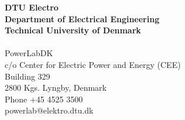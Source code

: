 \thispagestyle{empty} %
\frieze
\vspace*{\fill}
\noindent
\sffamily
\small
\textbf{DTU Electro}\\
\textbf{Department of Electrical Engineering}\\
\textbf{Technical University of Denmark}\\
\\
PowerLabDK\\
c/o Center for Electric Power and Energy (CEE)\\
Building 329\\
2800 Kgs. Lyngby, Denmark\\
Phone +45 4525 3500\\
powerlab@elektro.dtu.dk\\
\\
\normalsize
\normalfont
\vspace*{2.5cm}
